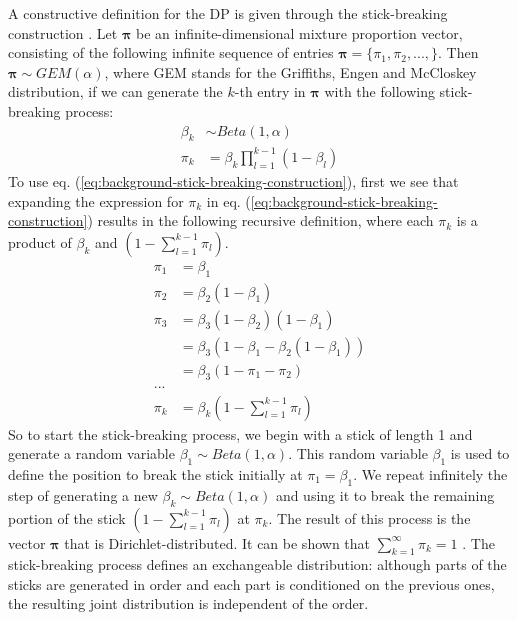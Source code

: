 A constructive definition for the DP is given through the stick-breaking construction \cite{ishwaran2011gibbs}. Let $\boldsymbol{\pi}$ be an infinite-dimensional mixture proportion vector, consisting of the following infinite sequence of entries $\boldsymbol{\pi}=\{\pi_1, \pi_2, ..., \}$. Then $\boldsymbol{\pi} \sim GEM(\alpha)$, where GEM stands for the Griffiths, Engen and McCloskey distribution, if we can generate the $k$-th entry in $\boldsymbol{\pi}$ with the following stick-breaking process:
\begin{equation}
\begin{aligned}
\beta_k &\sim Beta(1, \alpha) \\
\pi_k     &= \beta_k \prod_{l=1}^{k-1} (1-\beta_l) 
\end{aligned}
\label{eq:background-stick-breaking-construction}
\end{equation}
To use eq. (\ref{eq:background-stick-breaking-construction}), first we see that expanding the expression for $\pi_k$ in eq. (\ref{eq:background-stick-breaking-construction}) results in the following recursive definition, where each $\pi_k$ is a product of $\beta_k$ and $(1-\sum_{l=1}^{k-1} \pi_l)$.
\begin{equation}
\begin{aligned}
\pi_1 &= \beta_1 \\
\pi_2 &= \beta_2(1-\beta_1) \\
\pi_3 &= \beta_3(1-\beta_2)(1-\beta_1) \\
         &= \beta_3(1-\beta_1-\beta_2(1-\beta_1)) \\
         &= \beta_3(1-\pi_1-\pi_2) \\
... \\
\pi_k &= \beta_k(1-\sum_{l=1}^{k-1} \pi_l)
\end{aligned}
\label{eq:background-pi-gem}
\end{equation}
So to start the stick-breaking process, we begin with a stick of length 1 and generate a random variable $\beta_1 \sim Beta(1, \alpha)$. This random variable $\beta_1$ is used to define the position to break the stick initially at $\pi_1 = \beta_1$. We repeat infinitely the step of generating a new $\beta_k \sim Beta(1, \alpha)$ and using it to break the remaining portion of the stick $(1-\sum_{l=1}^{k-1} \pi_l)$ at $\pi_k$. The result of this process is the vector $\boldsymbol{\pi}$ that is Dirichlet-distributed. It can be shown that $\sum_{k=1}^{\infty} \pi_k=1$ \cite{ishwaran2011gibbs}. The stick-breaking process defines an exchangeable distribution: although parts of the sticks are generated in order and each part is conditioned on the previous ones, the resulting joint distribution is independent of the order.

